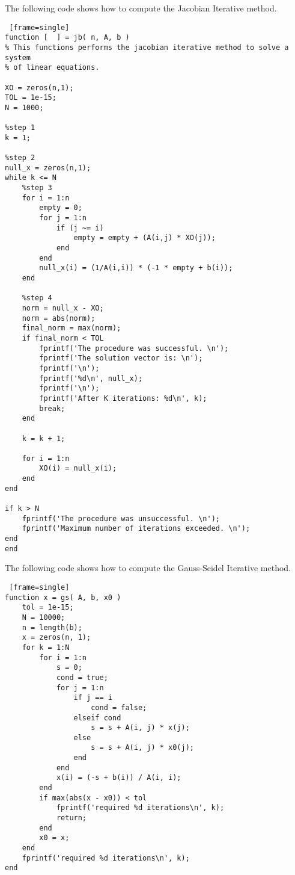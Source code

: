 \documentclass[paper=a4, fontsize=11pt]{scrartcl} %
\numberwithin{equation}{section} %
\numberwithin{figure}{section} %
\numberwithin{table}{section} %
\begin{document}
\bigskip
\bigskip

The following code shows how to compute the Jacobian Iterative method.  

\begin{lstlisting} [frame=single]
function [  ] = jb( n, A, b )
% This functions performs the jacobian iterative method to solve a system
% of linear equations.  

XO = zeros(n,1);
TOL = 1e-15;
N = 1000;

%step 1
k = 1;

%step 2
null_x = zeros(n,1);
while k <= N
    %step 3
    for i = 1:n
        empty = 0;
        for j = 1:n
            if (j ~= i)
                empty = empty + (A(i,j) * XO(j));
            end
        end
        null_x(i) = (1/A(i,i)) * (-1 * empty + b(i));
    end
    
    %step 4
    norm = null_x - XO;
    norm = abs(norm);
    final_norm = max(norm);
    if final_norm < TOL
        fprintf('The procedure was successful. \n');
        fprintf('The solution vector is: \n');
        fprintf('\n');
        fprintf('%d\n', null_x);
        fprintf('\n');
        fprintf('After K iterations: %d\n', k);
        break;
    end
    
    k = k + 1;
    
    for i = 1:n
        XO(i) = null_x(i);
    end
end

if k > N
    fprintf('The procedure was unsuccessful. \n');
    fprintf('Maximum number of iterations exceeded. \n');
end
end
\end{lstlisting}

\bigskip
\bigskip


The following code shows how to compute the Gauss-Seidel Iterative method.

\begin{lstlisting} [frame=single]
function x = gs( A, b, x0 )
    tol = 1e-15;
    N = 10000;
    n = length(b);
    x = zeros(n, 1);
    for k = 1:N
        for i = 1:n
            s = 0;
            cond = true;
            for j = 1:n
                if j == i
                    cond = false;
                elseif cond
                    s = s + A(i, j) * x(j);
                else
                    s = s + A(i, j) * x0(j);
                end
            end
            x(i) = (-s + b(i)) / A(i, i);
        end
        if max(abs(x - x0)) < tol
            fprintf('required %d iterations\n', k);
            return;
        end
        x0 = x;
    end
    fprintf('required %d iterations\n', k);
end
\end{lstlisting}


\end{document}
